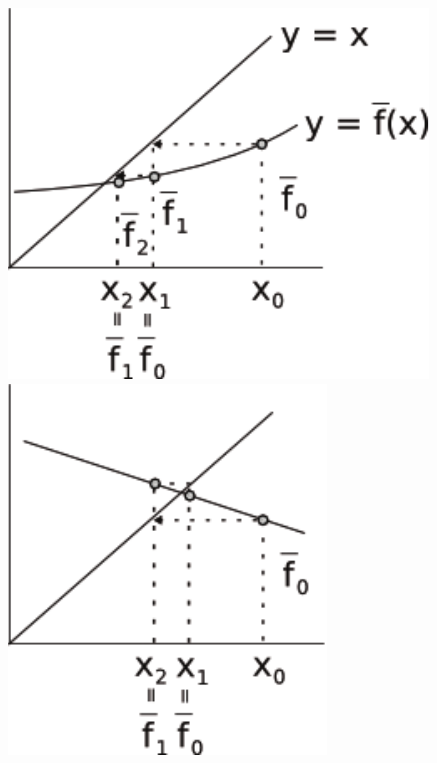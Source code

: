 \begin{figure}[htb]
  \setlength{\abovecaptionskip}{20pt}
  \centering
  \includegraphics[scale=0.9]{capitulos/capitulo1/figuras/substituicoes1-eps-converted-to.pdf}
  \includegraphics[scale=0.9]{capitulos/capitulo1/figuras/substituicoes2-eps-converted-to.pdf}

\end{figure}
